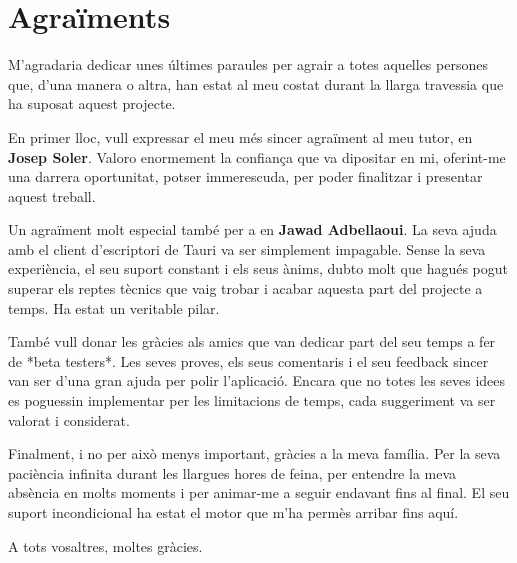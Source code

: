 \chapter*{Agraïments}

M'agradaria dedicar unes últimes paraules per agrair a totes aquelles persones que, d'una manera o altra, han estat al meu costat durant la llarga travessia que ha suposat aquest projecte.

En primer lloc, vull expressar el meu més sincer agraïment al meu tutor, en \textbf{Josep Soler}. Valoro enormement la confiança que va dipositar en mi, oferint-me una darrera oportunitat, potser immerescuda, per poder finalitzar i presentar aquest treball.

Un agraïment molt especial també per a en \textbf{Jawad Adbellaoui}. La seva ajuda amb el client d'escriptori de Tauri va ser simplement impagable. Sense la seva experiència, el seu suport constant i els seus ànims, dubto molt que hagués pogut superar els reptes tècnics que vaig trobar i acabar aquesta part del projecte a temps. Ha estat un veritable pilar.

També vull donar les gràcies als amics que van dedicar part del seu temps a fer de *beta testers*. Les seves proves, els seus comentaris i el seu feedback sincer van ser d'una gran ajuda per polir l'aplicació. Encara que no totes les seves idees es poguessin implementar per les limitacions de temps, cada suggeriment va ser valorat i considerat.

Finalment, i no per això menys important, gràcies a la meva família. Per la seva paciència infinita durant les llargues hores de feina, per entendre la meva absència en molts moments i per animar-me a seguir endavant fins al final. El seu suport incondicional ha estat el motor que m'ha permès arribar fins aquí.

A tots vosaltres, moltes gràcies.
